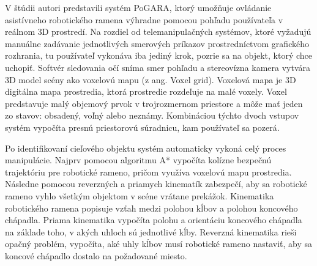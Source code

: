 V štúdii \cite{Proof_of_Concept_of_an_Assistive_Robotic_Arm_Control_Using_Artificial_Stereovision_and_Eye-Tracking} autori predstavili systém PoGARA, ktorý umožňuje ovládanie asistívneho robotického ramena výhradne pomocou pohľadu používateľa v reálnom 3D prostredí. Na rozdiel od telemanipulačných systémov, ktoré vyžadujú manuálne zadávanie jednotlivých smerových príkazov prostredníctvom grafického rozhrania, tu používateľ vykonáva iba jediný krok, pozrie sa na objekt, ktorý chce uchopiť. Softvér sledovania očí sníma smer pohľadu a stereovízna kamera vytvára 3D model scény ako voxelovú mapu (z ang. Voxel grid). Voxelová mapa je 3D digitálna mapa prostredia, ktorá prostredie rozdeľuje na malé voxely. Voxel predstavuje malý objemový prvok v trojrozmernom priestore a môže mať jeden zo stavov: obsadený, voľný alebo neznámy. Kombináciou týchto dvoch vstupov systém vypočíta presnú priestorovú súradnicu, kam používateľ sa pozerá.

Po identifikovaní cieľového objektu systém automaticky vykoná celý proces manipulácie. Najprv pomocou algoritmu A* vypočíta kolízne bezpečnú trajektóriu pre robotické rameno, pričom využíva voxelovú mapu prostredia. Následne pomocou reverzných a priamych kinematík zabezpečí, aby sa robotické rameno vyhlo všetkým objektom v scéne vrátane prekážok. Kinematika robotického ramena popisuje vzťah medzi polohou kĺbov a polohou koncového chápadla. Priama kinematika vypočíta polohu a orientáciu koncového chápadla na základe toho, v akých uhloch sú jednotlivé kĺby. Reverzná kinematika rieši opačný problém, vypočíta, aké uhly kĺbov musí robotické rameno nastaviť, aby sa koncové chápadlo dostalo na požadované miesto.

